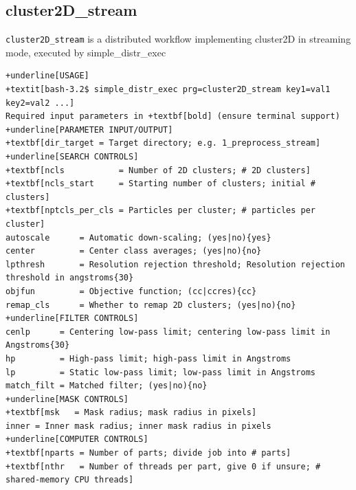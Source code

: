 \documentclass[a4paper,11pt]{article}
\newcommand{\prgname}[1]{\textcolor{NavyBlue}{\texttt{#1}}}
\begin{document}
\subsection{cluster2D\_stream}
\label{cluster2D_stream}
\prgname{cluster2D\_stream} is a distributed workflow implementing cluster2D in streaming mode, executed by simple\_distr\_exec
\begin{Verbatim}[commandchars=+\[\],fontsize=\small,breaklines=true]
+underline[USAGE]
+textit[bash-3.2$ simple_distr_exec prg=cluster2D_stream key1=val1 key2=val2 ...]
Required input parameters in +textbf[bold] (ensure terminal support)
+underline[PARAMETER INPUT/OUTPUT]
+textbf[dir_target = Target directory; e.g. 1_preprocess_stream]
+underline[SEARCH CONTROLS]
+textbf[ncls           = Number of 2D clusters; # 2D clusters]
+textbf[ncls_start     = Starting number of clusters; initial # clusters]
+textbf[nptcls_per_cls = Particles per cluster; # particles per cluster]
autoscale      = Automatic down-scaling; (yes|no){yes}
center         = Center class averages; (yes|no){no}
lpthresh       = Resolution rejection threshold; Resolution rejection threshold in angstroms{30}
objfun         = Objective function; (cc|ccres){cc}
remap_cls      = Whether to remap 2D clusters; (yes|no){no}
+underline[FILTER CONTROLS]
cenlp      = Centering low-pass limit; centering low-pass limit in Angstroms{30}
hp         = High-pass limit; high-pass limit in Angstroms
lp         = Static low-pass limit; low-pass limit in Angstroms
match_filt = Matched filter; (yes|no){no}
+underline[MASK CONTROLS]
+textbf[msk   = Mask radius; mask radius in pixels]
inner = Inner mask radius; inner mask radius in pixels
+underline[COMPUTER CONTROLS]
+textbf[nparts = Number of parts; divide job into # parts]
+textbf[nthr   = Number of threads per part, give 0 if unsure; # shared-memory CPU threads]
\end{Verbatim}
\end{document}
